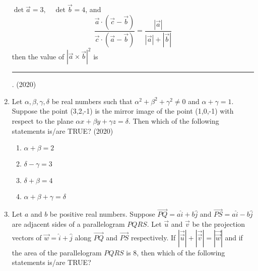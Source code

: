 \begin{enumerate}[label=\thesubsection.\arabic*.,ref=\thesubsection.\theenumi]
	$\det{\vec{a}}= 3, \quad \det{\vec{b}} = 4$, and 
$$\frac{\vec{a} \cdot (\vec{c} - \vec{b})}{\vec{c} \cdot (\vec{a} - \vec{b})} = \frac{|\vec{a}|}{|\vec{a}| + |\vec{b}|}$$
    then the value of $|\vec{a} \times \vec{b}|^2$ is \rule{1cm}{0.1pt}.
		\hfill (2020)
%
\item Let $\alpha,\beta,\gamma,\delta$ be real numbers such that $\alpha^2 + \beta^2 + \gamma^2 \neq 0$ and $\alpha + \gamma = 1$. Suppose the point (3,2,-1) is the mirror image of the point (1,0,-1) with respect to the plane ${\alpha}x + {\beta}y + {\gamma}z = \delta$. Then which of the following statements is/are TRUE?
\hfill (2020)
    \begin{multicols}{2} 
\begin{enumerate}
 \item $\alpha + \beta = 2$ 
 \item $\delta - \gamma = 3$
 \item $\delta + \beta = 4 $ 
 \item $\alpha + \beta + \gamma = \delta$
\end{enumerate}
    \end{multicols}
 \item Let $a$ and $b$ be positive real numbers. Suppose $\overrightarrow {PQ} = a\hat{i} + b\hat{j}$ and $\overrightarrow{PS} = a\hat{i} - b\hat{j}$ are adjacent sides 
of a parallelogram $PQRS$. Let $\overrightarrow{u}$ and $\overrightarrow{v}$ be the projection vectors of $\overrightarrow{w} = \hat{i} + \hat{j}$ along $\overrightarrow{PQ}$ and $\overrightarrow{PS}$ respectively. If $|\vec{\overrightarrow{u}}| + |\vec{\overrightarrow{v}}| = |\vec{\overrightarrow{w}}|$ and if the area of the parallelogram $PQRS$ is 8, then which of the following statements is/are TRUE?


\end{enumerate}

